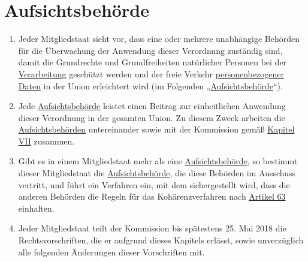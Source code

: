 \chapter{Aufsichtsbehörde}
\label{ch:51}


\begin{enumerate}

  \item Jeder Mitgliedstaat sieht vor, dass eine oder mehrere unabhängige Behörden für die Überwachung der Anwendung
   dieser Verordnung zuständig sind, damit die Grundrechte und Grundfreiheiten natürlicher Personen bei der
   \hyperref[itm:04-2]{Verarbeitung} geschützt werden und der freie Verkehr \hyperref[itm:04-1]{personenbezogener Daten} in der Union erleichtert wird
   (im Folgenden „\hyperref[itm:04-21]{Aufsichtsbehörde}“).
  \label{itm:51-1}

  \item Jede \hyperref[itm:04-21]{Aufsichtsbehörde} leistet einen Beitrag zur einheitlichen Anwendung dieser Verordnung in der gesamten Union.
   Zu diesem Zweck arbeiten die \hyperref[itm:04-21]{Aufsichtsbehörden} untereinander sowie mit der Kommission gemäß \hyperref[part:7]
   {Kapitel VII} zusammen.
  \label{itm:51-2}

  \item Gibt es in einem Mitgliedstaat mehr als eine \hyperref[itm:04-21]{Aufsichtsbehörde}, so bestimmt dieser Mitgliedstaat die
   \hyperref[itm:04-21]{Aufsichtsbehörde}, die diese Behörden im Ausschuss vertritt, und führt ein Verfahren ein, mit dem sichergestellt
   wird, dass die anderen Behörden die Regeln für das Kohärenzverfahren nach \hyperref[ch:63]{Artikel 63} einhalten.
  \label{itm:51-3}

  \item Jeder Mitgliedstaat teilt der Kommission bis spätestens 25. Mai 2018 die Rechtsvorschriften, die er aufgrund
   dieses Kapitels erlässt, sowie unverzüglich alle folgenden Änderungen dieser Vorschriften mit.
  \label{itm:51-4}

\end{enumerate}


